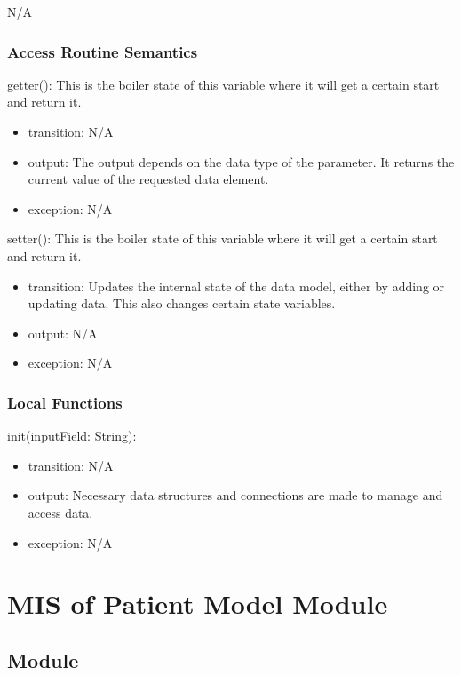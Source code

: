 \documentclass[12pt, titlepage]{article}
\begin{document}
N/A

\subsubsection{Access Routine Semantics}

\noindent getter(): This is the boiler state of this variable where it will get a certain start and return it.
\begin{itemize}
    \item transition: N/A
    \item output: The output depends on the data type of the parameter. It returns the current value of the requested data element.
    \item exception: N/A
\end{itemize}

\noindent setter(): This is the boiler state of this variable where it will get a certain start and return it.
\begin{itemize}
    \item transition: Updates the internal state of the data model, either by adding or updating data. This also changes certain state variables.
    \item output: N/A
    \item exception: N/A
\end{itemize}

\subsubsection{Local Functions}

\noindent init(inputField: String):
\begin{itemize}
\item transition: N/A
\item output: Necessary data structures and connections are made to manage and access data.
\item exception: N/A
\end{itemize}

\newpage

\section{MIS of Patient Model Module } \label{Patient_Model_Module}

\subsection{Module}
\end{document}
